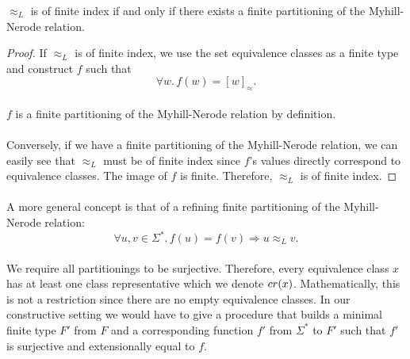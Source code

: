 
                    \begin{theorem}
                        $\approx_L$ is of finite index if and only if there exists a finite partitioning of the Myhill-Nerode relation.
                    \end{theorem}

                    \begin{proof}
                        If $\approx_L$ is of finite index, we use the set equivalence classes as a finite type and construct $f$ such that
                        \[
                            \forall w.\, f(w) = [w]_\approx.
                            \]
                            \paragraph{}
                            $f$ is a finite partitioning of the Myhill-Nerode relation by definition.

                            \paragraph{}
                            Conversely, if we have a finite partitioning of the Myhill-Nerode relation, we can easily see that $\approx_L$ must be of finite index since $f$'s values directly correspond to equivalence classes. The image of $f$ is finite. Therefore, $\approx_L$ is of finite index.
                        \end{proof}

                        \paragraph{}

                        A more general concept is that of a refining finite partitioning of the Myhill-Nerode relation:
                        \[
                            \forall u, v \in \Sigma^*. \,
                            f(u) = f(v) \Rightarrow u \approx_L v.
                            \]




                            \paragraph{}
                            We require all partitionings to be surjective.
                            Therefore, every equivalence class $x$ has at least one class representative which we denote $cr(x)$.
                            Mathematically, this is not a restriction since there are no empty equivalence classes.
                            In our constructive setting we would have to give a procedure that builds a minimal finite type $F'$ from $F$ and a corresponding function $f'$ from $\Sigma^*$ to $F'$ such that $f'$ is surjective and extensionally equal to $f$.

